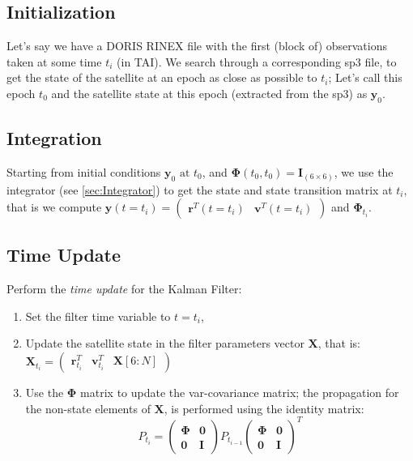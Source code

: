 \subsection{Initialization} \label{ssec:Initialization}
Let's say we have a DORIS RINEX file with the first (block of) observations 
taken at some time $t_i$ (in TAI). We search through a corresponding sp3 file, 
to get the state of the satellite at an epoch as close as possible to $t_i$; 
Let's call this epoch $t_0$ and the satellite state at this epoch (extracted 
from the sp3) as $\bm{y}_0$.

\subsection{Integration} \label{ssec:integration}
Starting from initial conditions $\bm{y}_0 \text{ at } t_0$, and 
$\bm{\Phi} (t_0,t_0) = \bm{I}_{(6 \times 6)}$, we use the integrator 
(see \ref{sec:Integrator}) to get the state and state transition matrix at $t_i$, 
that is we compute 
$\bm{y}(t=t_i) = \begin{pmatrix} \bm{r}^T(t=t_i) & \bm{v}^T(t=t_i) \end{pmatrix}$ 
and $\bm{\Phi} _{t_i}$.

\subsection{Time Update} \label{ssec:time-update}
Perform the \emph{time update} for the Kalman Filter:
\begin{enumerate}
    \item Set the filter time variable to $t=t_i$,
    \item Update the satellite state in the filter parameters vector $\bm{X}$, 
        that is: $\bm{X}_{t_i} = \begin{pmatrix} \bm{r}^T_{t_i} & \bm{v}^T_{t_i} & \bm{X}[6:N] \end{pmatrix}$
    \item Use the $\bm{\Phi}$ matrix to update the var-covariance matrix; the 
        propagation for the non-state elements of $\bm{X}$, is performed using 
        the identity matrix:
        \begin{equation}
            P_{t_i} = \begin{pmatrix} \bm{\Phi} & \bm{0} \\ \bm{0} & \bm{I} \end{pmatrix} 
                P_{t_{i-1}} 
                \begin{pmatrix} \bm{\Phi} & \bm{0} \\ \bm{0} & \bm{I} \end{pmatrix} ^T
        \end{equation}
\end{enumerate}

